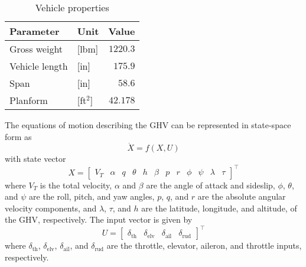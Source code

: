 \documentclass[]{../sty/aiaa-tc}
\begin{document}
  \begin{table}[H]
    \centering
    \caption{Vehicle properties}
    \begin{tabular}{llr}
      \toprule
      Parameter & Unit & Value \\ \midrule
      Gross weight & [lbm] & $1220.3$ \\
      Vehicle length & [in] & $175.9$ \\
      Span & [in] & $58.6$ \\
      Planform & [ft$^{2}$] & $42.178$ \\
      \bottomrule
    \end{tabular}\label{tab:vehicle_properties}
  \end{table}

  The equations of motion describing the GHV can be represented in state-space form as
  \begin{equation*}
    \dot{X}=f({X},U)
  \end{equation*}
  with state vector
  \begin{equation}
    \label{eqn:fullstatevector_x}
    X=\left[
    \begin{array}{cccccccccccc}
      V_{T} &  \alpha & q &\theta & h & \beta &p & r & \phi &\psi &\lambda & \tau
    \end{array}\right]^{\top}
  \end{equation}
  where $V_{T}$ is the total velocity, $\alpha$ and $\beta$ are the angle of attack and sideslip, $\phi$, $\theta$, and $\psi$ are the roll, pitch, and yaw angles, $p$, $q$, and $r$ are the absolute angular velocity components, and $\lambda$, $\tau$, and $h$ are the latitude, longitude, and altitude, of the GHV, respectively.
  The input vector is given by
  \begin{equation}
    \label{eqn:fullcontrolvector}
    U=\left[
    \begin{array}{cccc}
      \delta_{\text{th}} & \delta_{\text{elv}} & \delta_{\text{ail}} & \delta_{\text{rud}}
    \end{array}\right]^{\top}
  \end{equation}
  where $\delta_{\text{th}}$, $\delta_{\text{elv}}$, $\delta_{\text{ail}}$, and $\delta_{\text{rud}}$ are the throttle, elevator, aileron, and throttle inputs, respectively.
\end{document}

